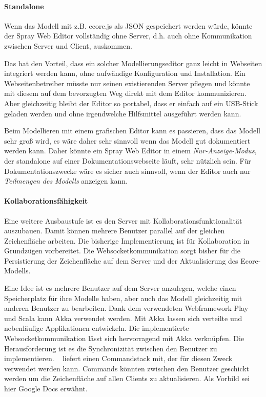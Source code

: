 \paragraph{Standalone}

Wenn das Modell mit z.B. ecore.js als JSON gespeichert werden würde,
könnte der Spray Web Editor vollständig ohne Server, d.h. auch ohne
Kommunikation zwischen Server und Client, auskommen.

Das hat den Vorteil, dass ein solcher Modellierungseditor ganz leicht
in Webseiten integriert werden kann, ohne aufwändige
Konfiguration und Installation. Ein Webseitenbetreiber müsste nur seinen existierenden
Server pflegen und könnte mit diesem auf dem bevorzugten Weg direkt mit
dem Editor kommunizieren. Aber gleichzeitig bleibt der Editor so portabel,
dass er einfach auf ein USB-Stick geladen werden und ohne irgendwelche
Hilfsmittel ausgeführt werden kann.

Beim Modellieren mit einem grafischen Editor kann es passieren, dass das
Modell sehr groß wird, es wäre daher sehr sinnvoll wenn das Modell
gut dokumentiert werden kann. Daher könnte ein Spray Web Editor in einem
\emph{Nur-Anzeige-Modus}, der standalone auf einer Dokumentationswebseite
läuft, sehr nützlich sein.
Für Dokumentationszwecke wäre es sicher auch sinnvoll, wenn der Editor
auch nur \emph{Teilmengen des Modells} anzeigen kann.


\paragraph{Kollaborationsfähigkeit}

Eine weitere Ausbaustufe ist es den Server mit Kollaborationsfunktionalität auszubauen.
Damit können mehrere Benutzer parallel auf der gleichen Zeichenfläche arbeiten. Die bisherige 
Implementierung ist für Kollaboration in Grundzügen vorbereitet. Die Websocketkommunikation
sorgt bisher für die Persistierung der Zeichenfläche auf dem Server und der Aktualisierung des Ecore-Modells.

Eine Idee ist es mehrere Benutzer auf dem Server anzulegen, welche einen
Speicherplatz für ihre Modelle haben, aber auch das Modell gleichzeitig
mit anderen Benutzer zu bearbeiten. Dank dem verwendeten Webframework Play und Scala kann
Akka verwendet werden. Mit Akka lassen sich verteilte und nebenläufige Applikationen entwickeln.
Die implementierte Websocketkommunikation lässt sich hervorragend mit Akka verknüpfen.
Die Herausforderung ist es die Synchronizität zwischen den Benutzer zu implementieren.
\dd~ liefert einen Commandstack mit, der für diesen Zweck verwendet werden kann. Commands könnten
zwischen den Benutzer geschickt werden um die Zeichenfläche auf allen Clients zu aktualisieren.
Als Vorbild sei hier Google Docs erwähnt.

